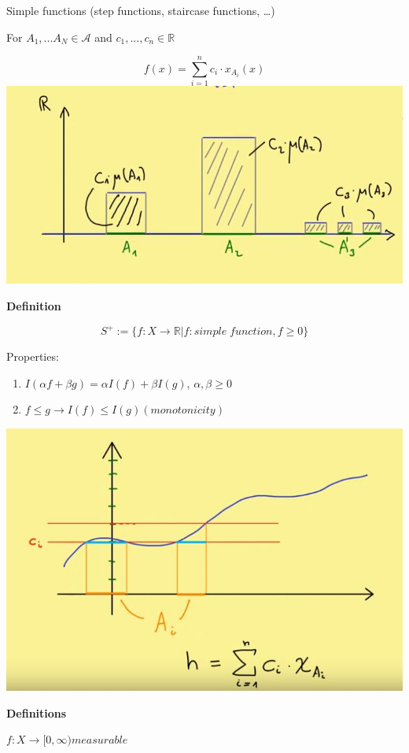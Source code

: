 \documentclass[
]{book}
\begin{document}
Simple functions (step functions, staircase functions, \ldots)

For \(A_1, ... A_N \in \mathcal{A}\) and \(c_1,...,c_n \in \mathbb{R}\)

\[f(x)=\sum_{i=1}^n c_i \cdot x_{A_i}(x)\]
\includegraphics{yt.jpg}

\textbf{Definition}

\[S^{+}:=\{ f: X \rightarrow \mathbb{R}| f: simple \; function, f\geq0\}\]

Properties:

\begin{enumerate}
\def\labelenumi{(\arabic{enumi})}
\item
  \(I(\alpha f + \beta g)=\alpha I(f) +\beta I(g)\), \(\alpha, \beta\geq 0\)
\item
  \(f \leq g \rightarrow I(f) \leq I(g) (monotonicity)\)
\end{enumerate}

\includegraphics{yt2.jpg}

\textbf{Definitions}

\(f: X \rightarrow [0, \infty) measurable\)
\end{document}
